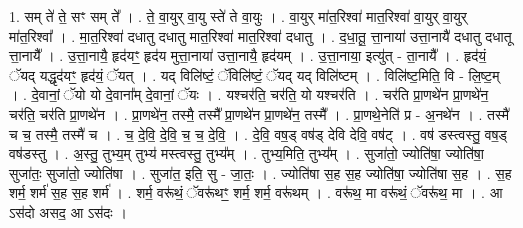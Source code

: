 \documentclass[17pt]{extarticle}
\begin{document}
1. सम् ते॑ ते॒ सꣳ सम् ते᳚ । . ते॒ वा॒युर् वा॒यु स्ते॑ ते वा॒युः । . वा॒युर् मा॑त॒रिश्वा॑ मात॒रिश्वा॑ वा॒युर् वा॒युर् मा॑त॒रिश्वा᳚ । . मा॒त॒रिश्वा॑ दधातु दधातु मात॒रिश्वा॑ मात॒रिश्वा॑ दधातु । . द॒धा॒तू॒ त्ता॒नाया॑ उत्ता॒नायै॑ दधातु दधातू त्ता॒नायै᳚ । . उ॒त्ता॒नायै॒ हृद॑यꣳ॒॒ हृद॑य मुत्ता॒नाया॑ उत्ता॒नायै॒ हृद॑यम् । . उ॒त्ता॒नाया॒ इत्यु॑त् - ता॒नायै᳚ । . हृद॑यं॒ ॅयद् यद्धृद॑यꣳ॒॒ हृद॑यं॒ ॅयत् । . यद् विलि॑ष्टं॒ ॅविलि॑ष्टं॒ ॅयद् यद् विलि॑ष्टम् । . विलि॑ष्ट॒मिति॒ वि - लि॒ष्ट॒म् । . दे॒वानां॒ ॅयो यो दे॒वाना᳚म् दे॒वानां॒ ॅयः । . यश्चर॑ति॒ चर॑ति॒ यो यश्चर॑ति । . चर॑ति प्रा॒णथे॑न प्रा॒णथे॑न॒ चर॑ति॒ चर॑ति प्रा॒णथे॑न । . प्रा॒णथे॑न॒ तस्मै॒ तस्मै᳚ प्रा॒णथे॑न प्रा॒णथे॑न॒ तस्मै᳚ । . प्रा॒णथे॒नेति॑ प्र - अ॒नथे॑न । . तस्मै॑ च च॒ तस्मै॒ तस्मै॑ च । . च॒ दे॒वि॒ दे॒वि॒ च॒ च॒ दे॒वि॒ । . दे॒वि॒ वष॒ड् वष॑ड् देवि देवि॒ वष॑ट् । . वष॑ डस्त्वस्तु॒ वष॒ड् वष॑डस्तु । . अ॒स्तु॒ तुभ्य॒म् तुभ्य॑ मस्त्वस्तु॒ तुभ्य᳚म् । . तुभ्य॒मिति॒ तुभ्य᳚म् । . सुजा॑तो॒ ज्योति॑षा॒ ज्योति॑षा॒ सुजा॑तः॒ सुजा॑तो॒ ज्योति॑षा । . सुजा॑त॒ इति॒ सु - जा॒तः॒ । . ज्योति॑षा स॒ह स॒ह ज्योति॑षा॒ ज्योति॑षा स॒ह । . स॒ह शर्म॒ शर्म॑ स॒ह स॒ह शर्म॑ । . शर्म॒ वरू॑थं॒ ॅवरू॑थꣳ॒॒ शर्म॒ शर्म॒ वरू॑थम् । . वरू॑थ॒ मा वरू॑थं॒ ॅवरू॑थ॒ मा । . आ ऽस॑दो असद॒ आ ऽस॑दः । \newline
\end{document}
